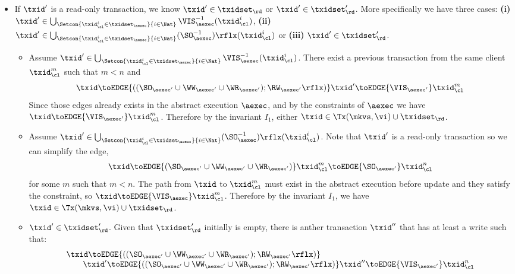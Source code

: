 \begin{itemize}
\begin{itemize}
\item If \( \txid' \) is a read-only transaction, we know \( \txid' \in \txidset_\rd \) or \( \txid' \in \txidset'_\rd \).
    More specifically we have three cases: \textbf{(i)} \( \txid' \in \bigcup_{\Setcon{\txid_{\cl}^{i} \in \txidset_{\aexec} }{ i \in \Nat }} \VIS_{\aexec}^{-1}(\txid^i_\cl) \), \textbf{(ii)} \( \txid' \in \bigcup_{\Setcon{\txid_{\cl}^{i} \in \txidset_{\aexec} }{ i \in \Nat }} (\SO_{\aexec}^{-1})\rflx(\txid^i_\cl) \) or \textbf{(iii)} \( \txid' \in \txidset'_\rd\).
    \begin{itemize}
        \item Assume \( \txid' \in \bigcup_{\Setcon{\txid_{\cl}^{i} \in \txidset_{\aexec} }{ i \in \Nat }} \VIS_{\aexec}^{-1}(\txid^i_\cl) \).
        There exist a previous transaction from the same client \( \txid_\cl^m\) such that \( m < n \) and 
        \[ 
            \txid \toEDGE{\left( (\SO_{\aexec'} \cup \WW_{\aexec'} \cup \WR_{\aexec'} ) ; \RW_{\aexec'}\rflx \right) } \txid' \toEDGE{\VIS_{\aexec'}}  \txid_\cl^m 
        \]
        Since those edges already exists in the abstract execution \( \aexec\), and by the constraints of \( \aexec \) we have \( \txid \toEDGE{\VIS_{\aexec'}} \txid_\cl^m\).
        Therefore by the invariant \( I_1 \), either \( \txid \in \Tx(\mkvs, \vi) \cup \txidset_\rd \).
    \item Assume \( \txid' \in \bigcup_{\Setcon{\txid_{\cl}^{i} \in \txidset_{\aexec} }{ i \in \Nat }} (\SO_{\aexec}^{-1})\rflx(\txid^i_\cl) \).
        Note that  \( \txid' \) is a read-only transaction so we can simplify the edge,
        \[ 
            \txid \toEDGE{\left( \SO_{\aexec'} \cup \WW_{\aexec'} \cup \WR_{\aexec'}  \right)} \txid_\cl^m \toEDGE{\SO_{\aexec'}}  \txid_\cl^n 
        \] 
        for some \( m \) such that \( m < n \).
        The path from \( \txid \) to \( \txid_\cl^m \) must exist in the abstract execution before update and they satisfy the constraint, so \( \txid \toEDGE{\VIS_\aexec} \txid_\cl^m \).
        Therefore by the invariant \( I_1 \), we have \( \txid \in \Tx(\mkvs, \vi) \cup \txidset_\rd \).
    \item \( \txid' \in \txidset'_\rd \). 
        Given that \( \txidset'_\rd \) initially is empty, there is anther transaction \( \txid'' \) that has at least a write such that:
        \[
        \begin{array}{l}
            \txid \toEDGE{\left( (\SO_{\aexec'} \cup \WW_{\aexec'} \cup \WR_{\aexec'} ) ; \RW_{\aexec'}\rflx \right) } \\
            \qquad \txid' \toEDGE{\left( (\SO_{\aexec'} \cup \WW_{\aexec'} \cup \WR_{\aexec'} ) ; \RW_{\aexec'}\rflx \right) } \txid'' \toEDGE{\VIS_{\aexec'}}  \txid_\cl^n 

\end{array}\]
\end{itemize}
\end{itemize}
\end{itemize}
